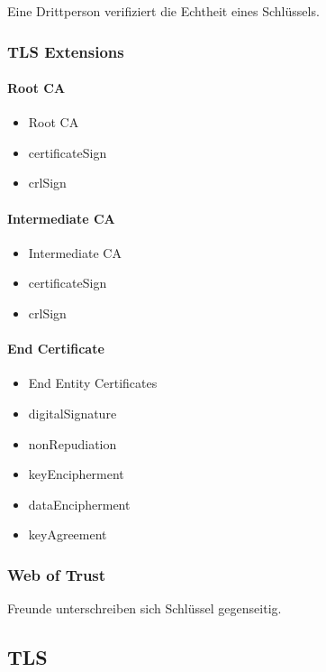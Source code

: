 Eine Drittperson verifiziert die Echtheit eines Schlüssels.

\subsubsection{TLS Extensions}

\paragraph{Root CA}
\begin{itemize}
	\item	Root CA
	\item	certificateSign
	\item	crlSign
\end{itemize}

\paragraph{Intermediate CA}
\begin{itemize}
	\item	Intermediate CA
	\item	certificateSign
	\item	crlSign
\end{itemize}

\paragraph{End Certificate}
\begin{itemize}
	\item	End Entity Certificates
	\item	digitalSignature
	\item	nonRepudiation
	\item	keyEncipherment
	\item	dataEncipherment
	\item	keyAgreement
\end{itemize}

\subsubsection{Web of Trust}

Freunde unterschreiben sich Schlüssel gegenseitig.


\subsection{TLS}





